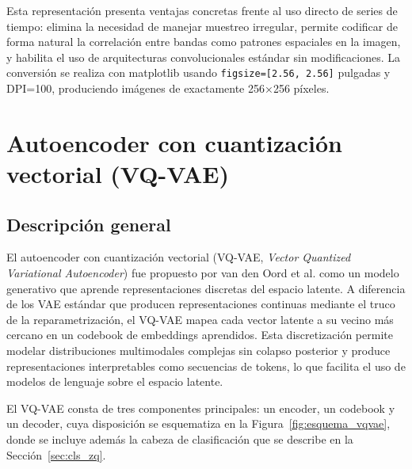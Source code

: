 Esta representación presenta ventajas concretas frente al uso directo de series de tiempo: elimina la necesidad de manejar muestreo irregular, permite codificar de forma natural la correlación entre bandas como patrones espaciales en la imagen, y habilita el uso de arquitecturas convolucionales estándar sin modificaciones. La conversión se realiza con matplotlib usando \texttt{figsize=[2.56, 2.56]} pulgadas y DPI=100, produciendo imágenes de exactamente 256×256 píxeles.

\section{Autoencoder con cuantización vectorial (VQ-VAE)}

\subsection{Descripción general}

El autoencoder con cuantización vectorial (VQ-VAE, \textit{Vector Quantized Variational Autoencoder}) fue propuesto por van den Oord et al. \cite{vqvae2017} como un modelo generativo que aprende representaciones discretas del espacio latente. A diferencia de los VAE estándar que producen representaciones continuas mediante el truco de la reparametrización, el VQ-VAE mapea cada vector latente a su vecino más cercano en un codebook de embeddings aprendidos. Esta discretización permite modelar distribuciones multimodales complejas sin colapso posterior y produce representaciones interpretables como secuencias de tokens, lo que facilita el uso de modelos de lenguaje sobre el espacio latente.

El VQ-VAE consta de tres componentes principales: un encoder, un codebook y un decoder, cuya disposición se esquematiza en la Figura~\ref{fig:esquema_vqvae}, donde se incluye además la cabeza de clasificación que se describe en la Sección~\ref{sec:cls_zq}.


